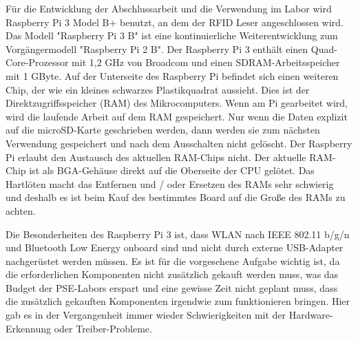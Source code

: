 Für die Entwicklung der Abschlussarbeit und die Verwendung im Labor wird Raspberry Pi 3 Model B+ benutzt, an dem der RFID Leser angeschlossen wird. Das Modell "Raspberry Pi 3 B" ist eine kontinuierliche Weiterentwicklung zum Vorgängermodell "Raspberry Pi 2 B".
Der Raspberry Pi 3 enthält einen Quad-Core-Prozessor mit 1,2 GHz von Broadcom und einen SDRAM-Arbeitsspeicher mit 1 GByte.  Auf der Unterseite des Raspberry Pi befindet sich einen weiteren Chip, der wie ein kleines schwarzes Plastikquadrat aussieht. Dies ist der Direktzugriffsspeicher (RAM) des Mikrocomputers. Wenn am Pi gearbeitet wird, wird die laufende Arbeit auf dem RAM gespeichert. Nur wenn die Daten explizit auf die microSD-Karte geschrieben werden, dann werden sie zum nächsten Verwendung gespeichert und nach dem Ausschalten nicht gelöscht. Der Raspberry Pi  erlaubt den Austausch des aktuellen RAM-Chips nicht. Der aktuelle RAM-Chip ist als BGA-Gehäuse direkt auf die Oberseite der CPU gelötet. Das Hartlöten macht das Entfernen und / oder Ersetzen des RAMs sehr schwierig und deshalb es ist beim Kauf des bestimmtes Board auf die Große des RAMs zu achten.

Die Besonderheiten des Raspberry Pi 3 ist, dass WLAN nach IEEE 802.11 b/g/n und Bluetooth Low Energy onboard sind und nicht durch externe USB-Adapter nachgerüstet werden müssen. Es ist für die vorgesehene Aufgabe wichtig ist, da die erforderlichen Komponenten nicht zusätzlich gekauft werden muss, was das Budget der PSE-Labors erspart und eine gewisse Zeit nicht geplant muss, dass die zusätzlich gekauften Komponenten irgendwie zum funktionieren bringen. Hier gab es in der Vergangenheit immer wieder Schwierigkeiten mit der Hardware-Erkennung oder Treiber-Probleme. 

